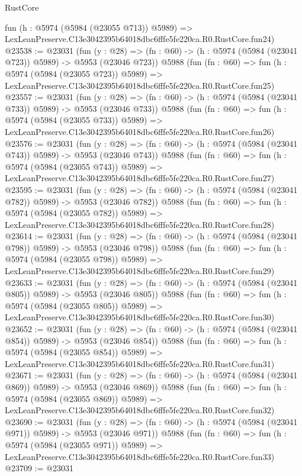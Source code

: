 \begin{lexlean}{RustCore}
\begin{coremodule}
    fun (h : @5974 (@5984 (@23055 @713)) @5989) =>
    LexLeanPreserve.C13e3042395b64018dbc6fffe5fe220ca.R0.RustCore.fun24)
@23538 := @23031
    (fun (y : @28) => (fn : @60) -> (h : @5974 (@5984 (@23041 @723)) @5989) -> @5953 (@23046 @723))
    @5988
    (fun (fn : @60) =>
    fun (h : @5974 (@5984 (@23055 @723)) @5989) =>
    LexLeanPreserve.C13e3042395b64018dbc6fffe5fe220ca.R0.RustCore.fun25)
@23557 := @23031
    (fun (y : @28) => (fn : @60) -> (h : @5974 (@5984 (@23041 @733)) @5989) -> @5953 (@23046 @733))
    @5988
    (fun (fn : @60) =>
    fun (h : @5974 (@5984 (@23055 @733)) @5989) =>
    LexLeanPreserve.C13e3042395b64018dbc6fffe5fe220ca.R0.RustCore.fun26)
@23576 := @23031
    (fun (y : @28) => (fn : @60) -> (h : @5974 (@5984 (@23041 @743)) @5989) -> @5953 (@23046 @743))
    @5988
    (fun (fn : @60) =>
    fun (h : @5974 (@5984 (@23055 @743)) @5989) =>
    LexLeanPreserve.C13e3042395b64018dbc6fffe5fe220ca.R0.RustCore.fun27)
@23595 := @23031
    (fun (y : @28) => (fn : @60) -> (h : @5974 (@5984 (@23041 @782)) @5989) -> @5953 (@23046 @782))
    @5988
    (fun (fn : @60) =>
    fun (h : @5974 (@5984 (@23055 @782)) @5989) =>
    LexLeanPreserve.C13e3042395b64018dbc6fffe5fe220ca.R0.RustCore.fun28)
@23614 := @23031
    (fun (y : @28) => (fn : @60) -> (h : @5974 (@5984 (@23041 @798)) @5989) -> @5953 (@23046 @798))
    @5988
    (fun (fn : @60) =>
    fun (h : @5974 (@5984 (@23055 @798)) @5989) =>
    LexLeanPreserve.C13e3042395b64018dbc6fffe5fe220ca.R0.RustCore.fun29)
@23633 := @23031
    (fun (y : @28) => (fn : @60) -> (h : @5974 (@5984 (@23041 @805)) @5989) -> @5953 (@23046 @805))
    @5988
    (fun (fn : @60) =>
    fun (h : @5974 (@5984 (@23055 @805)) @5989) =>
    LexLeanPreserve.C13e3042395b64018dbc6fffe5fe220ca.R0.RustCore.fun30)
@23652 := @23031
    (fun (y : @28) => (fn : @60) -> (h : @5974 (@5984 (@23041 @854)) @5989) -> @5953 (@23046 @854))
    @5988
    (fun (fn : @60) =>
    fun (h : @5974 (@5984 (@23055 @854)) @5989) =>
    LexLeanPreserve.C13e3042395b64018dbc6fffe5fe220ca.R0.RustCore.fun31)
@23671 := @23031
    (fun (y : @28) => (fn : @60) -> (h : @5974 (@5984 (@23041 @869)) @5989) -> @5953 (@23046 @869))
    @5988
    (fun (fn : @60) =>
    fun (h : @5974 (@5984 (@23055 @869)) @5989) =>
    LexLeanPreserve.C13e3042395b64018dbc6fffe5fe220ca.R0.RustCore.fun32)
@23690 := @23031
    (fun (y : @28) => (fn : @60) -> (h : @5974 (@5984 (@23041 @971)) @5989) -> @5953 (@23046 @971))
    @5988
    (fun (fn : @60) =>
    fun (h : @5974 (@5984 (@23055 @971)) @5989) =>
    LexLeanPreserve.C13e3042395b64018dbc6fffe5fe220ca.R0.RustCore.fun33)
@23709 := @23031

\end{coremodule}
\end{lexlean}
